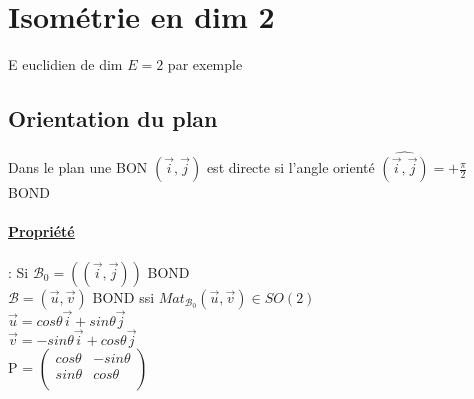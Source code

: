 \documentclass{article}
\author{Frederic Becerril}
\begin{document}
\section{Isométrie en dim 2}

E euclidien de dim $E=2$ par exemple

\subsection{Orientation du plan }

Dans le plan une BON $(\vec{i}, \vec{j})$ est directe si l'angle orienté $\widehat{(\vec{i}, \vec{j})} = +\frac{\pi}{2}$ BOND

\paragraph{\underline{Propriété}}:
Si $\mathcal{B}_0 = ((\vec{i}, \vec{j}))$ BOND\\
$\mathcal{B} = (\vec{u}, \vec{v})$ BOND ssi $Mat_{\mathcal{B}_0} (\vec{u}, \vec{v}) \in SO(2)$\\
$\vec{u} = cos \theta \vec{i} + sin \theta \vec{j}$\\
$\vec{v} = -sin \theta \vec{i} + cos \theta \vec{j}$ \vspace*{2mm}\\
P = $\begin{pmatrix}
    cos \theta & -sin \theta\\
    sin \theta & cos \theta\\
\end{pmatrix}$
\end{document}
